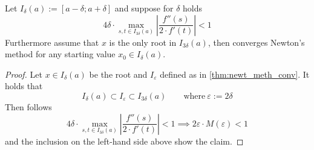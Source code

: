 \begin{corollary}
   Let \(I_\delta(a) := [a - \delta; a + \delta]\) and suppose for \(\delta\) holds
   \[4\delta \cdot \max_{s,t \in I_{3\delta}(a)} \left|\frac{f''(s)}{2 \cdot f'(t)}\right| < 1\]
   Furthermore assume that \(x\) is the only root in \(I_{3\delta}(a)\), then converges Newton's method for any starting value \(x_0 \in I_\delta(a)\).
\end{corollary}
\begin{proof}
   Let \(x \in I_\delta(a)\) be the root and \(I_\varepsilon\) defined as in \cref{thm:newt_meth_conv}.
   It holds that
   \[I_\delta(a) \subset I_\varepsilon \subset I_{3\delta}(a) \qquad\text{where}~\varepsilon := 2\delta\]
   Then follows
   \[4\delta \cdot \max_{s,t \in I_{3\delta}(a)} \left|\frac{f''(s)}{2 \cdot f'(t)}\right| < 1 \implies 2 \varepsilon \cdot M(\varepsilon) < 1\]
   and the inclusion on the left-hand side above show the claim.
\end{proof}

